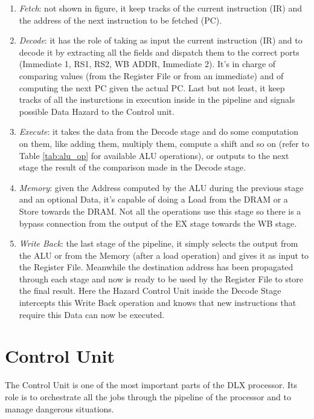 \begin{enumerate}
    \item \emph{Fetch}: not shown in figure, it keep tracks of the current instruction (IR) and the address of the next instruction to be fetched (PC).
    \item \emph{Decode}: it has the role of taking as input the current instruction (IR) and to decode it by extracting all the fields and dispatch them to the correct ports (Immediate 1, RS1, RS2, WB ADDR, Immediate 2). It's in charge of comparing values (from the Register File or from an immediate) and of computing the next PC given the actual PC. Last but not least, it keep tracks of all the insturctions in execution inside in the pipeline and signals possible Data Hazard to the Control unit.
    \item \emph{Execute}: it takes the data from the Decode stage and do some computation on them, like adding them, multiply them, compute a shift and so on (refer to Table \ref{tab:alu_op} for available ALU operations), or outputs to the next stage the result of the comparison made in the Decode stage.
    \item \emph{Memory}: given the Address computed by the ALU during the previous stage and an optional Data, it's capable of doing a Load from the DRAM or a Store towards the DRAM. Not all the operations use this stage so there is a bypass connection from the output of the EX stage towards the WB stage.
    \item \emph{Write Back}: the last stage of the pipeline, it simply selects the output from the ALU or from the Memory (after a load operation) and gives it as input to the Register File. Meanwhile the destination address has been propagated through each stage and now is ready to be used by the Register File to store the final result. Here the Hazard Control Unit inside the Decode Stage intercepts this Write Back operation and knows that new instructions that require this Data can now be executed.
\end{enumerate}


\section{Control Unit}

The Control Unit is one of the most important parts of the DLX processor. Its role is to orchestrate all the jobs through the pipeline of the processor and to manage dangerous situations.\\

